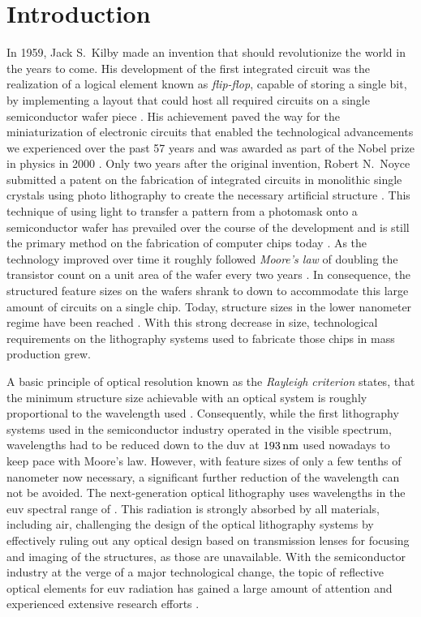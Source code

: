 \glsresetall
\chapter{Introduction} \label{ch:Intro}
In 1959, Jack S.~Kilby made an invention that should revolutionize the world in the years to come. His development of the first integrated circuit was the realization of a logical element known as \emph{flip-flop}, capable of storing a single bit, by implementing a layout that could host all required circuits on a single semiconductor wafer piece  \cite{kilby_invention_1976}. His achievement paved the way for the miniaturization of electronic circuits that enabled the technological advancements we experienced over the past 57 years and was awarded as part of the Nobel prize in physics in 2000 \cite{noauthor_press_nodate}. Only two years after the original invention, Robert N.~Noyce submitted a patent on the fabrication of integrated circuits in monolithic single crystals using photo lithography to create the necessary artificial structure \cite{noyce_semiconductor_1961}. This technique of using light to transfer a pattern from a photomask onto a semiconductor wafer has prevailed over the course of the development and is still the primary method on the fabrication of computer chips today \cite{mack_fundamental_2008}. As the technology improved over time it roughly followed \emph{Moore's law} of doubling the transistor count on a unit area of the wafer every two years \cite{moore_cramming_1998}. In consequence, the structured feature sizes on the wafers shrank to down to accommodate this large amount of circuits on a single chip. Today, structure sizes in the lower nanometer regime have been reached \cite{international_roadmap_committee_international_2015}. With this strong decrease in size, technological requirements on the lithography systems used to fabricate those chips in mass production grew.

A basic principle of optical resolution known as the \emph{Rayleigh criterion} states, that the minimum structure size achievable with an optical system is roughly proportional to the wavelength used \cite{lord_rayleigh_xxxi._1879}. Consequently, while the first lithography systems used in the semiconductor industry operated in the visible spectrum, wavelengths had to be reduced down to the \gls{duv} at $\nm{193}$ used nowadays to keep pace with Moore's law. However, with feature sizes of only a few tenths of nanometer now necessary, a significant further reduction of the wavelength can not be avoided. The next-generation optical lithography uses wavelengths in the \gls{euv} spectral range of . This radiation is strongly absorbed by all materials, including air, challenging the design of the optical lithography systems by effectively ruling out any optical design based on transmission lenses for focusing and imaging of the structures, as those are unavailable. With the semiconductor industry at the verge of a major technological change, the topic of reflective optical elements for \gls{euv} radiation has gained a large amount of attention and experienced extensive research efforts \cite{bakshi_euv_2009}.

